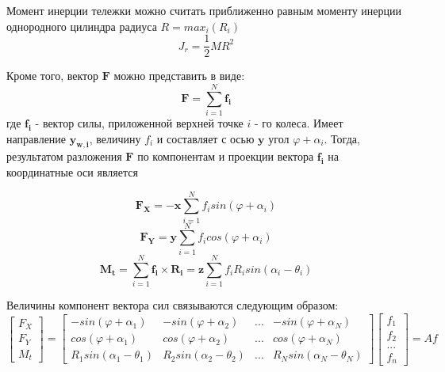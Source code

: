 \documentclass[oneside,final,14pt]{extreport}
\newcommand{\bs}{\boldsymbol}
\begin{document}
\begin{figure}[H]
\end{figure}
Момент инерции тележки можно считать приближенно равным моменту инерции однородного цилиндра радиуса $R=max_{i}(R_{i})$ 
\begin{equation}
J_{r}
=
\frac{1}{2}
MR^{2}
\end{equation}


Кроме того, вектор $\bs{F}$ можно представить в  виде:
\begin{equation}
\bs{F}
=
\sum_{i=1}^{N}\bs{f_{i}}
\end{equation}
где $\bs{f_{i}}$ - вектор силы, приложенной верхней точке $i$ - го колеса. Имеет направление $\bs{y_{w,i}}$, величину $f_{i}$ и составляет с осью $\bs{y}$ угол $\varphi + \alpha_{i}$.  
Тогда, результатом разложения $\bs{F}$ по компонентам и проекции вектора $\bs{f_{i}}$ на координатные оси является

\begin{equation}
\bs{F_{X}}
=
-
\bs{x}
\sum_{i=1}^{N}f_{i} sin(\varphi +\alpha_{i})
\end{equation}
\begin{equation}
\bs{F_{Y}}
=
\bs{y}
\sum_{i=1}^{N}f_{i} cos(\varphi +\alpha_{i})
\end{equation}
\begin{equation}
\label{eq:rot_force}
\bs{M_{t}}
=
\sum_{i=1}^{N}\bs{f_{i}}\times\bs{R_{i}}
=
\bs{z}
\sum_{i=1}^{N}f_{i}R_{i}sin(\alpha_{i} - \theta_{i})
\end{equation}



Величины компонент вектора сил связываются следующим образом:
\begin{equation}
\begin{bmatrix}
F_{X} \\
F_{Y} \\
M_{t}
\end{bmatrix}
=
\begin{bmatrix}
-sin(\varphi + \alpha_{1}) &
-sin(\varphi + \alpha_{2}) &
...              &
-sin(\varphi + \alpha_{N}) \\
cos(\varphi + \alpha_{1}) &
cos(\varphi + \alpha_{2}) &
...              &
cos(\varphi + \alpha_{N}) \\ 
R_{1}sin(\alpha_{1} - \theta_{1}) &
R_{2}sin(\alpha_{2} - \theta_{2}) &
 ... &
R_{N}sin(\alpha_{N} - \theta_{N})
\end{bmatrix}
\begin{bmatrix}
f_{1} \\
f_{2} \\
...   \\
f_{n}
\end{bmatrix}
=
Af
\end{equation}
\end{document}
